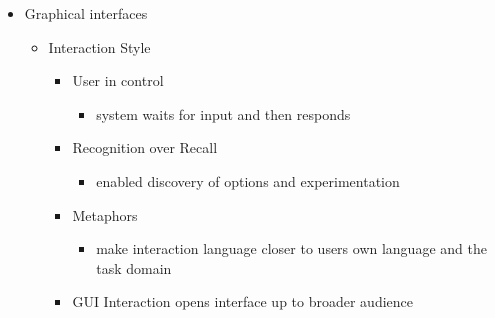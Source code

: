 \documentclass[twoside]{article}
\begin{document}
\begin{itemize}
\item Graphical interfaces 
\begin{itemize}
\item Interaction Style 
\begin{itemize}
\item User in control 
\begin{itemize}
\item system waits for input and then responds
\end{itemize}
\item Recognition over Recall
\begin{itemize}
\item enabled discovery of options and experimentation
\end{itemize}
\item Metaphors 
\begin{itemize}
\item make interaction language closer to users own language and the task domain
\end{itemize}
\item GUI Interaction opens interface up to broader audience
\end{itemize}
\end{itemize}
\end{itemize}
\end{document}

